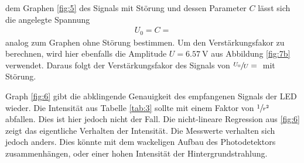 \justifying dem Graphen \ref{fig:5} des Signals mit Störung und dessen Parameter $C$ lässt sich die angelegte Spannung 
\begin{align}
    U_0 = C = \text{}
\end{align}
analog zum Graphen ohne Störung bestimmen. Um den Verstärkungsfakor zu berechnen, wird hier ebenfalls die Amplitude $U = \SI{6.57}{\volt}$ aus 
Abbildung \ref{fig:7b} verwendet. Daraus folgt der Verstärkungsfakor des Signals von $\sfrac{U_0}{U} = \text{}$ mit Störung.

\justifying Graph \ref{fig:6} gibt die abklingende Genauigkeit des empfangenen Signals der LED wieder. Die Intensität aus Tabelle
\ref{tab:3} sollte mit einem Faktor von $\sfrac{1}{r^2}$ abfallen. Dies ist hier jedoch nicht der Fall. Die nicht-lineare Regression aus \ref{fig:6} 
zeigt das eigentliche Verhalten der Intensität. Die Messwerte verhalten sich jedoch anders. Dies könnte mit dem wackeligen Aufbau des Photodetektors
zusammenhängen, oder einer hohen Intensität der Hintergrundstrahlung.

\newpage
\printbibliography

